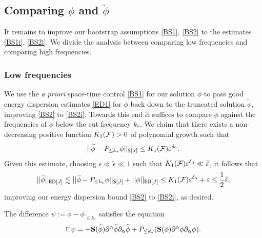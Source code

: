 \subsection{Comparing $\phi$ and $\widetilde\phi$}

It remains to improve our bootstrap assumptions \eqref{BS1}, \eqref{BS2} to the estimates \eqref{BS1i}, \eqref{BS2i}. We divide the analysis between comparing low frequencies and comparing high frequencies. 

\subsubsection{Low frequencies}

We use the \textit{a priori} space-time control \eqref{BS1} for our solution $\phi$ to pass good energy dispersion estimates \eqref{ED1} for $\phi$ back down to the truncated solution $\widetilde\phi$, improving \eqref{BS2} to \eqref{BS2i}. Towards this end it suffices to compare $\widetilde \phi$ against the frequencies of $\phi$ below the cut frequency $k_*$. We claim that there exists a non-decreasing positive function $K_1 (\mathcal F) > 0$ of polynomial growth such that 
	\[
		|| \widetilde \phi - P_{\leq k_*} \phi||_{\mathsf S[J]} \leq K_{1} (\mathcal F) \varepsilon^{\delta_0}.
	\]
Given this estimate, choosing $\epsilon \ll \widetilde\epsilon \ll 1$ such that $K_{1} (\mathcal F) \varepsilon^{\delta_0} \ll \widetilde {\varepsilon}$, it follows that
	\[
		||\widetilde \phi ||_{\mathsf{ED} [J]}
			\lesssim || \widetilde \phi - P_{\leq k_*} \phi||_{\mathsf S[J]} + ||\phi ||_{\mathsf{ED}[J]} \leq K_{1} (\mathcal F) \varepsilon^{\delta_0} + \varepsilon \leq \frac12 \widetilde{\varepsilon},
	\]
improving our energy dispersion bound \eqref{BS2} to \eqref{BS2i}, as desired.

The difference $\psi := \widetilde \phi - \phi_{\leq k_*}$ satisfies the equation 
	\[
		\Box \psi = - {\bf S}(\widetilde \phi) \partial^\alpha \widetilde \phi \partial_\alpha \widetilde\phi + P_{\leq k_*}({\bf S}(\phi) \partial^\alpha \phi \partial_\alpha \phi).
	\]

